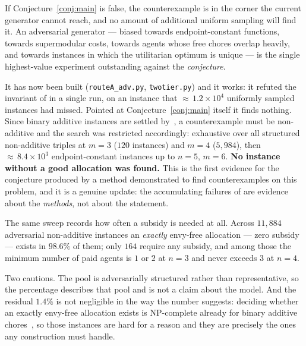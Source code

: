 \begin{remark}
\label{rem:adversarial}
If Conjecture~\ref{conj:main} is false, the counterexample is in the corner the
current generator cannot reach, and no amount of additional uniform sampling
will find it. An adversarial generator --- biased towards endpoint-constant
functions, towards supermodular costs, towards agents whose free chores overlap
heavily, and towards instances in which the utilitarian optimum is unique --- is
the single highest-value experiment outstanding against the \emph{conjecture}.

It has now been built (\texttt{routeA\_adv.py}, \texttt{twotier.py}) and it
works: it refuted the invariant of  in a single run, on an
instance that ${\approx}\,1.2 \times 10^{4}$ uniformly sampled instances had
missed. Pointed at Conjecture~\ref{conj:main} itself it finds nothing. Since
binary additive instances are settled by~\cite{LMS26}, a counterexample must be
non-additive and the search was restricted accordingly: exhaustive over all
structured non-additive triples at $m = 3$ ($120$ instances) and $m = 4$
($5{,}984$), then ${\approx}\,8.4 \times 10^{3}$ endpoint-constant instances up
to $n = 5$, $m = 6$. \textbf{No instance without a good allocation was found.}
This is the first evidence for the conjecture produced by a method demonstrated
to find counterexamples on this problem, and it is a genuine update: the
accumulating failures of
 are evidence
about the \emph{methods}, not about the statement.
\end{remark}

\begin{remark}
\label{rem:exactEF}
The same sweep records how often a subsidy is needed at all. Across $11{,}884$
adversarial non-additive instances an \emph{exactly} envy-free allocation ---
zero subsidy --- exists in $98.6\%$ of them; only $164$ require any subsidy, and
among those the minimum number of paid agents is $1$ or $2$ at $n=3$ and never
exceeds $3$ at $n=4$.

Two cautions. The pool is adversarially structured rather than representative,
so the percentage describes that pool and is not a claim about the model. And
the residual $1.4\%$ is not negligible in the way the number suggests: deciding
whether an exactly envy-free allocation exists is NP-complete already for binary
additive chores~\cite{BSV21}, so those instances are hard for a reason and they
are precisely the ones any construction must handle.
\end{remark}

